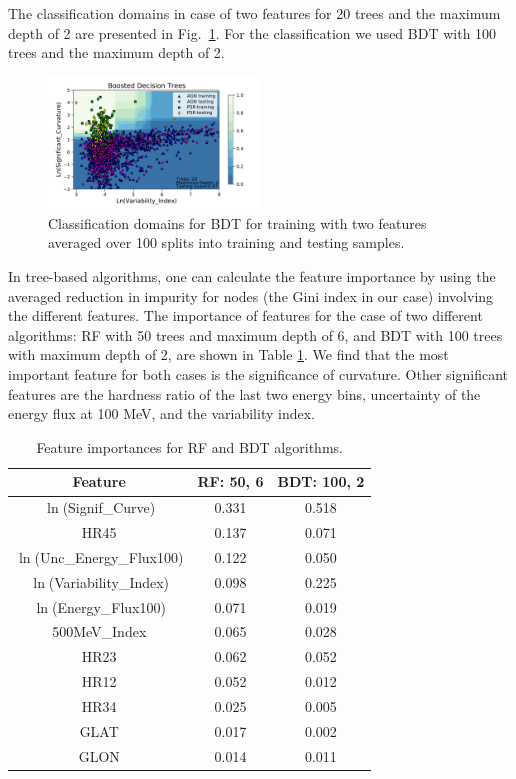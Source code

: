 \documentclass[referee]{aa} %
\begin{document}
The classification domains in case of two features for 20 trees and the maximum depth of 2 are presented in Fig.~\ref{fig:BDT_domains}. 
For the classification we used BDT with 100 trees and the maximum depth of 2.


\begin{figure}[h]
\centering
\includegraphics[width=0.5\textwidth]{plots/classification_domains/bdt_20_2.pdf}
\caption{Classification domains for BDT for training with two features 
averaged over 100 splits into training and testing samples.
}
\label{fig:BDT_domains}
\end{figure}



In tree-based algorithms, one can calculate the feature importance by using the averaged reduction in impurity for nodes (the Gini index in our case) involving the different features. 
The importance of features for the case of two different algorithms: RF with 50 trees and maximum depth of 6, and BDT with 100 trees with maximum depth of 2,  are shown in Table \ref{tab:feat_imp}.
We find that the most important feature for both cases is the significance of curvature.
Other significant features are the hardness ratio of the last two energy bins, uncertainty of the energy flux at 100 MeV, and the variability index.


\begin{table}[!h]
\caption{Feature importances for RF and BDT algorithms.
}
\label{tab:feat_imp}
\tiny
\centering
\renewcommand{\tabcolsep}{1mm}
\renewcommand{\arraystretch}{1}

\begin{tabular}{c c c}
\hline
\hline
Feature & RF: 50, 6 & BDT: 100, 2\\
\hline
{ $\ln$(Signif\_Curve)}&  0.331  & 0.518   \\
{ HR45}&0.137&0.071\\
{ $\ln$(Unc\_Energy\_Flux100)} &0.122& 0.050   \\
$\ln$(Variability\_Index)& 0.098&0.225  \\
$\ln$(Energy\_Flux100) & 0.071&0.019   \\
500MeV\_Index&0.065& 0.028  \\
HR23 & 0.062&0.052  \\
HR12& 0.052&0.012  \\
HR34&0.025&0.005\\
GLAT &0.017& 0.002     \\
GLON & 0.014&0.011  \\
\hline
\end{tabular}
\end{table}
\end{document}
